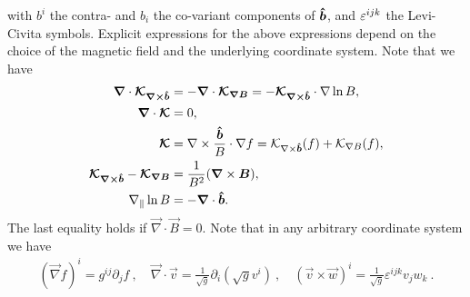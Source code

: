 with $b^i$ the contra- and $b_i$ the co-variant components of $\bm{\hat{b}}$, and
$\varepsilon^{ijk}$ the Levi-Civita symbols.
Explicit expressions for the above expressions
depend on the choice of the magnetic field and the underlying coordinate system.
Note that we have
\begin{align}
    {\boldsymbol{\nabla}} \cdot {\boldsymbol{\mathcal K_{\nabla\times\bm{\hat{b}}}}}
    &= -{\boldsymbol{\nabla}} \cdot {\boldsymbol{\mathcal K_{\nabla B}}} = -{\boldsymbol{ \mathcal K_{\nabla\times\bm{\hat{b}}}}}\cdot\nabla\ln B, \\
    {\boldsymbol{\nabla}}\cdot{\boldsymbol{ \mathcal K}} &= 0, \\
    {\boldsymbol{\mathcal K}} &=
     \nabla\times\frac{\bm{\hat{b}}}{B}\cdot\nabla f
    = \mathcal K_{\nabla\times\bm{\hat{b}}}(f) + \mathcal K_{\nabla B}(f),\\
    {\boldsymbol{ \mathcal K_{\nabla\times\bm{\hat{b}}}}} - {\boldsymbol{ \mathcal K_{\nabla B}}} &= \frac{1}{B^2} ({\boldsymbol{\nabla}} \times {\boldsymbol{B}}), \\
    \nabla_\parallel \ln B &= -{\boldsymbol{\nabla}}\cdot\bm{\hat{b}}.
    \label{eq:curl_curvature}
\end{align}
The last equality holds if $\vec\nabla\cdot \vec B = 0$.
Note that in any arbitrary coordinate system we have
\begin{align}
(\vec \nabla f)^i = g^{ij}\partial_j f ~, \quad
\vec \nabla \cdot \vec v = \frac{1}{\sqrt{g}}\partial_i \left(\sqrt{g} v^i\right) ~, \quad
(\vec v \times \vec w)^i = \frac{1}{\sqrt{g}}\varepsilon^{ijk} v_jw_k ~.
\end{align}

